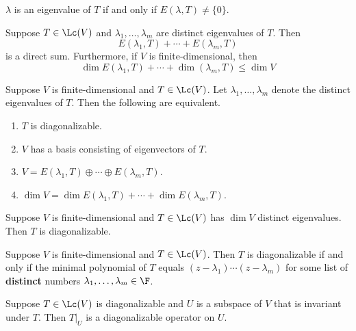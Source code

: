 \documentclass{extarticle}
\begin{document}
\begin{remark}
    \(\lambda\) is an eigenvalue of \(T\) if and only if \(E(\lambda, T) \neq \{0\}\).
\end{remark}

\begin{thm}
    Suppose \(T \in \Lc(V)\) and \(\lambda_1, \ldots, \lambda_m\) are distinct eigenvalues of \(T\). Then 
    \[E(\lambda_1, T) + \cdots + E(\lambda_m, T)\]
    is a direct sum. Furthermore, if \(V\) is finite-dimensional, then 
    \[\dim E(\lambda_1, T) + \cdots + \dim (\lambda_m, T) \leq \dim V\]
\end{thm}

\begin{thm}
    Suppose \(V\) is finite-dimensional and \(T \in \Lc(V)\). Let \(\lambda_1, \ldots, \lambda_m\) denote 
    the distinct eigenvalues of \(T\). Then the following are equivalent.
    \begin{enumerate}[label=(\alph*)]
        \item \(T\) is diagonalizable. 
        \item \(V\) has a basis consisting of eigenvectors of \(T\). 
        \item \(V = E(\lambda_1, T) \oplus \cdots \oplus E(\lambda_m, T)\). 
        \item \(\dim V = \dim E(\lambda_1, T) + \cdots + \dim E(\lambda_m, T)\).
    \end{enumerate}
\end{thm}

\begin{corollary}
    Suppose \(V\) is finite-dimensional and \(T \in \Lc(V)\) has \(\dim V\) distinct eigenvalues. 
    Then \(T\) is diagonalizable.
\end{corollary}

\begin{thm}
    Suppose \(V\) is finite-dimensional and \(T \in \Lc(V)\). Then \(T\) is diagonalizable if and only if 
    the minimal polynomial of \(T\) equals \((z - \lambda_1)\cdots(z - \lambda_m)\) for some 
    list of \textbf{distinct} numbers \(\lambda_1, \ldots, \lambda_m \in \F\).
\end{thm}

\begin{corollary}
    Suppose \(T \in \Lc(V)\) is diagonalizable and \(U\) is a subspace of \(V\) that is invariant 
    under \(T\). Then \(T |_U\) is a diagonalizable operator on \(U\). 
\end{corollary}
\end{document}
